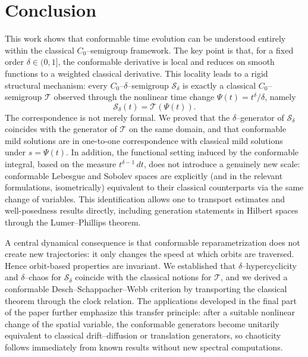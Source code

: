 \documentclass[preprint,12pt]{elsarticle}
\begin{document}
\section*{Conclusion}

This work shows that conformable time evolution can be understood entirely within the classical $C_0$--semigroup framework. The key point is that, for a fixed order $\delta\in(0,1]$, the conformable derivative is local and reduces on smooth functions to a weighted classical derivative. This locality leads to a rigid structural mechanism: every $C_0$--$\delta$--semigroup $\mathcal S_\delta$ is exactly a classical $C_0$--semigroup $\mathcal T$ observed through the nonlinear time change $\Psi(t)=t^\delta/\delta$, namely
\[
\mathcal S_\delta(t)=\mathcal T(\Psi(t)).
\]
The correspondence is not merely formal. We proved that the $\delta$--generator of $\mathcal S_\delta$ coincides with the generator of $\mathcal T$ on the same domain, and that conformable mild solutions are in one-to-one correspondence with classical mild solutions under $s=\Psi(t)$. In addition, the functional setting induced by the conformable integral, based on the measure $t^{\delta-1}\,dt$, does not introduce a genuinely new scale: conformable Lebesgue and Sobolev spaces are explicitly (and in the relevant formulations, isometrically) equivalent to their classical counterparts via the same change of variables. This identification allows one to transport estimates and well-posedness results directly, including generation statements in Hilbert spaces through the Lumer--Phillips theorem.

A central dynamical consequence is that conformable reparametrization does not create new trajectories: it only changes the speed at which orbits are traversed. Hence orbit-based properties are invariant. We established that $\delta$--hypercyclicity and $\delta$--chaos for $\mathcal S_\delta$ coincide with the classical notions for $\mathcal T$, and we derived a conformable Desch--Schappacher--Webb criterion by transporting the classical theorem through the clock relation. The applications developed in the final part of the paper further emphasize this transfer principle: after a suitable nonlinear change of the spatial variable, the conformable generators become unitarily equivalent to classical drift--diffusion or translation generators, so chaoticity follows immediately from known results without new spectral computations.
\end{document}
